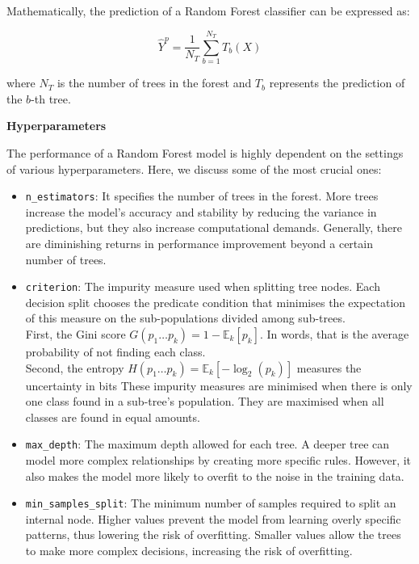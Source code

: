 \documentclass[twocolumn]{article}
\begin{document}
Mathematically, the prediction of a Random Forest classifier can be expressed as:

\begin{equation}
    \hat{Y}^p = \frac{1}{N_T} \sum_{b=1}^{N_T} T_b(X)
\end{equation}

where \( N_T \) is the number of trees in the forest and \( T_b \) represents the prediction of the \( b \)-th tree.

\textbf{\large Hyperparameters}

The performance of a Random Forest model is highly dependent on the settings of various hyperparameters. Here, we discuss some of the most crucial ones:

\begin{itemize}
    \item \texttt{n\_estimators}: It specifies the number of trees in the forest. More trees increase the model's accuracy and stability by reducing the variance in predictions, but they also increase computational demands. Generally, there are diminishing returns in performance improvement beyond a certain number of trees.

    \item \texttt{criterion}: The impurity measure used when splitting tree nodes. Each decision split chooses the predicate condition that minimises the expectation of this measure on the sub-populations divided among sub-trees. \\
    First, the Gini score \( \displaystyle G(p_1 \dots p_k) = 1 - \mathbb{E}_k[p_k]\). In words, that is the average probability of not finding each class. \\
    Second, the entropy \(\displaystyle H(p_1 \dots p_k) = \mathbb{E}_k[-\log_2 (p_k)]\) measures the uncertainty in bits 
    These impurity measures are minimised when there is only one class found in a sub-tree's population. They are maximised when all classes are found in equal amounts.

    \item \texttt{max\_depth}: The maximum depth allowed for each tree. A deeper tree can model more complex relationships by creating more specific rules. However, it also makes the model more likely to overfit to the noise in the training data.

    \item \texttt{min\_samples\_split}: The minimum number of samples required to split an internal node. Higher values prevent the model from learning overly specific patterns, thus lowering the risk of overfitting. Smaller values allow the trees to make more complex decisions, increasing the risk of overfitting.


\end{itemize}
\end{document}

